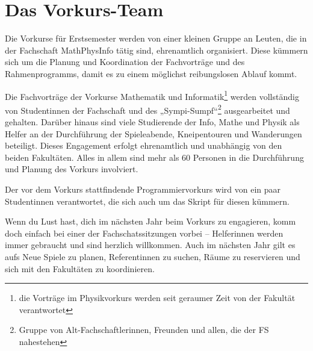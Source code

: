 \vspace{-3mm}

\section{Das Vorkurs-Team}
\vspace{-1mm}

Die Vorkurse für Erstsemester werden von einer kleinen Gruppe an Leuten, die in der Fachschaft MathPhysInfo tätig sind, ehrenamtlich organisiert. Diese kümmern sich um die Planung und Koordination der Fachvorträge und des Rahmenprogramms, damit es zu einem möglichst reibungslosen Ablauf kommt.

Die Fachvorträge der Vorkurse Mathematik und Informatik\footnote{die Vorträge im Physikvorkurs werden seit geraumer Zeit von der Fakultät verantwortet} werden vollständig von Studentinnen der Fachschaft und des „Sympi-Sumpf“\footnote{Gruppe von Alt-Fachschaftlerinnen, Freunden und allen, die der FS nahestehen} ausgearbeitet und gehalten. Darüber hinaus sind viele Studierende der Info, Mathe und Physik als Helfer an der Durchführung der Spieleabende, Kneipentouren und Wanderungen beteiligt. Dieses Engagement erfolgt ehrenamtlich und unabhängig von den beiden Fakultäten. Alles in allem sind mehr als 60 Personen in die Durchführung und Planung des Vorkurs involviert.

Der vor dem Vorkurs stattfindende Programmiervorkurs wird von ein paar Studentinnen verantwortet, die sich auch um das Skript für diesen kümmern.

Wenn du Lust hast, dich im nächsten Jahr beim Vorkurs zu engagieren, komm doch einfach bei einer der Fachschatssitzungen vorbei -- Helferinnen werden immer gebraucht und sind herzlich willkommen. Auch im nächsten Jahr gilt es aufs Neue Spiele zu planen, Referentinnen zu suchen, Räume zu reservieren und sich mit den Fakultäten zu koordinieren.
